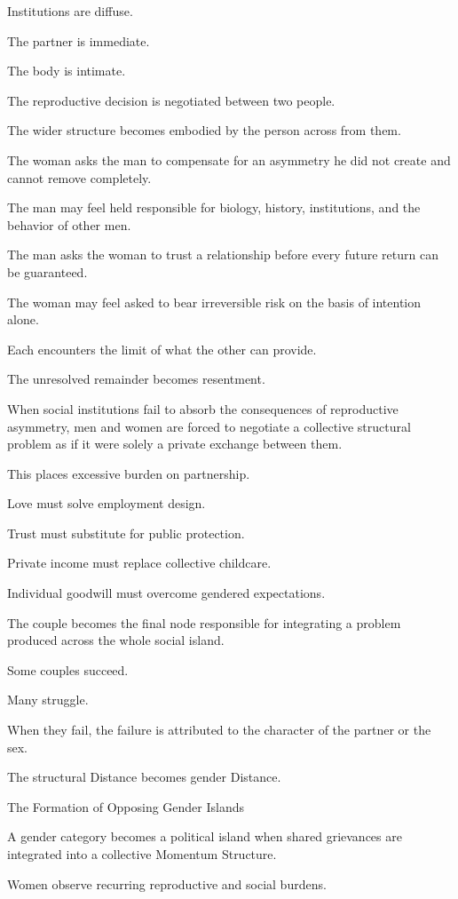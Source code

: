 Institutions are diffuse.

The partner is immediate.

The body is intimate.

The reproductive decision is negotiated between two people.

The wider structure becomes embodied by the person across from them.

The woman asks the man to compensate for an asymmetry he did not create and cannot remove completely.

The man may feel held responsible for biology, history, institutions, and the behavior of other men.

The man asks the woman to trust a relationship before every future return can be guaranteed.

The woman may feel asked to bear irreversible risk on the basis of intention alone.

Each encounters the limit of what the other can provide.

The unresolved remainder becomes resentment.

When social institutions fail to absorb the consequences of reproductive asymmetry, men and women are forced to negotiate a collective structural problem as if it were solely a private exchange between them.

This places excessive burden on partnership.

Love must solve employment design.

Trust must substitute for public protection.

Private income must replace collective childcare.

Individual goodwill must overcome gendered expectations.

The couple becomes the final node responsible for integrating a problem produced across the whole social island.

Some couples succeed.

Many struggle.

When they fail, the failure is attributed to the character of the partner or the sex.

The structural Distance becomes gender Distance.

The Formation of Opposing Gender Islands

A gender category becomes a political island when shared grievances are integrated into a collective Momentum Structure.

Women observe recurring reproductive and social burdens.

